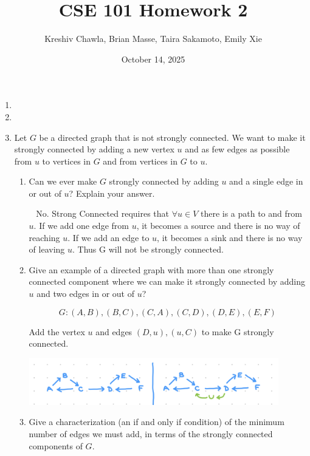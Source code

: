 \documentclass[12pt, letterpaper]{article}
\title{CSE 101 Homework 2}
\author{Kreshiv Chawla, Brian Masse, Taira Sakamoto, Emily Xie}
\date{October 14, 2025}
\begin{document}
\maketitle
\newpage

\begin{enumerate}

\item

\newpage
\item 

\newpage
\item
Let $G$ be a directed graph that is not strongly connected.
We want to make it strongly connected by adding a new vertex $u$ and
as few edges as possible from $u$ to vertices in $G$ and from vertices
in $G$ to $u$.  

\begin{enumerate}

\item Can we ever make $G$ strongly connected by adding $u$ and a single edge
in or out of $u$? Explain your answer.

\-\ \newline
No. Strong Connected requires that \(\forall u \in V\) there is a path to and from \(u\). If we add one edge from \(u\), it becomes a source and there is no way of reaching \(u\). If we add an edge to \(u\), it becomes a sink and there is no way of leaving \(u\). Thus G will not be strongly connected. 
\-\ \newline

\item Give an example of a directed graph with more than one strongly connected component where we can make it strongly connected by adding $u$ and two edges
in or out of $u$?

\[
G: (A, B), (B, C), (C, A), (C, D), (D, E), (E, F)
\]

Add the vertex \(u\) and edges \( (D, u), (u, C) \) to make G strongly connected. 

\includegraphics[width=0.9\textwidth]{src/CSE101 hw2 q3.png}


\item Give a characterization (an if and only if condition) of the minimum number of edges we must add,
in terms of the strongly connected components of $G$.


\end{enumerate}
\end{enumerate}
\end{document}
